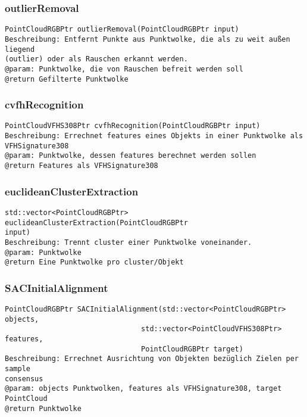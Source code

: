 \documentclass{suturo}
\begin{document}
\subsubsection{outlierRemoval}
\begin{verbatim}
PointCloudRGBPtr outlierRemoval(PointCloudRGBPtr input)
Beschreibung: Entfernt Punkte aus Punktwolke, die als zu weit außen liegend
(outlier) oder als Rauschen erkannt werden.
@param: Punktwolke, die von Rauschen befreit werden soll
@return Gefilterte Punktwolke
\end{verbatim}\label{func:outlierremoval}

\subsubsection{cvfhRecognition}
\begin{verbatim}
PointCloudVFHS308Ptr cvfhRecognition(PointCloudRGBPtr input)
Beschreibung: Errechnet features eines Objekts in einer Punktwolke als
VFHSignature308
@param: Punktwolke, dessen features berechnet werden sollen
@return Features als VFHSignature308
\end{verbatim}\label{func:cvfhRecognition}

\subsubsection{euclideanClusterExtraction}
\begin{verbatim}
std::vector<PointCloudRGBPtr> euclideanClusterExtraction(PointCloudRGBPtr
input)
Beschreibung: Trennt cluster einer Punktwolke voneinander.
@param: Punktwolke
@return Eine Punktwolke pro cluster/Objekt
\end{verbatim}\label{func:euclideanClusterExtraction}

\subsubsection{SACInitialAlignment}
\begin{verbatim}
PointCloudRGBPtr SACInitialAlignment(std::vector<PointCloudRGBPtr> objects,
                                std::vector<PointCloudVFHS308Ptr> features,
                                PointCloudRGBPtr target)
Beschreibung: Errechnet Ausrichtung von Objekten bezüglich Zielen per sample
consensus
@param: objects Punktwolken, features als VFHSignature308, target PointCloud
@return Punktwolke
\end{verbatim}\label{func:sacinitialalignment}
\end{document}
